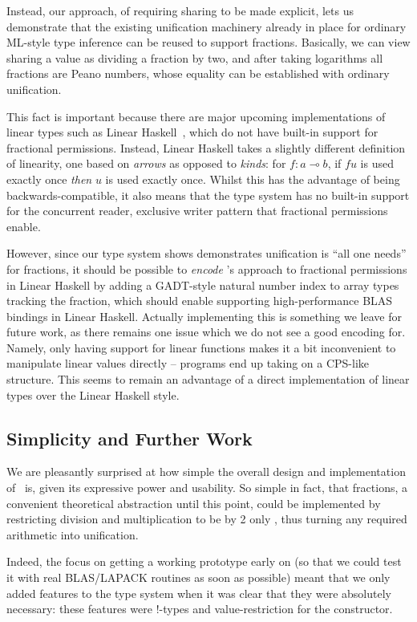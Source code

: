 Instead, our approach, of requiring sharing to be made explicit, lets us
demonstrate that the existing unification machinery already in place for
ordinary ML-style type inference can be reused to support fractions. Basically,
we can view sharing a value as dividing a fraction by two, and after taking
logarithms all fractions are Peano numbers, whose equality can be established
with ordinary unification.

This fact is important because there are major upcoming implementations of
linear types such as Linear Haskell~\cite{bernardy2017linear}, which do not
have built-in support for fractional permissions. Instead, Linear Haskell takes
a slightly different definition of linearity, one based on \emph{arrows} as
opposed to \emph{kinds}: for $f : a \multimap b$, if $f u$ is used exactly once
\emph{then} $u$ is used exactly once. Whilst this has the advantage of being
backwards-compatible, it also means that the type system has no built-in
support for the concurrent reader, exclusive writer pattern that fractional
permissions enable.

However, since our type system shows demonstrates unification is ``all one
needs'' for fractions, it should be possible to \emph{encode} \lang's approach
to fractional permissions in Linear Haskell by adding a GADT-style natural
number index to array types tracking the fraction, which should enable
supporting high-performance BLAS bindings in Linear Haskell. Actually
implementing this is something we leave for future work, as there remains one
issue which we do not see a good encoding for. Namely, only having support for
linear functions makes it a bit inconvenient to manipulate linear values
directly -- programs end up taking on a CPS-like structure. This seems to
remain an advantage of a direct implementation of linear types over the Linear
Haskell style.


\subsection{Simplicity and Further Work}

We are pleasantly surprised at how simple the overall design and implementation
of \lang\ is, given its expressive power and usability.  So simple in fact,
that fractions, a convenient theoretical abstraction until this point, could be
implemented by restricting division and multiplication to be by 2 only
\cite{boyland2003}, thus turning any required arithmetic into unification.

Indeed, the focus on getting a working prototype early on (so that we could
test it with real BLAS/LAPACK routines as soon as possible) meant that we only
added features to the type system when it was clear that they were absolutely
necessary: these features were !-types and value-restriction for the
 constructor. 

